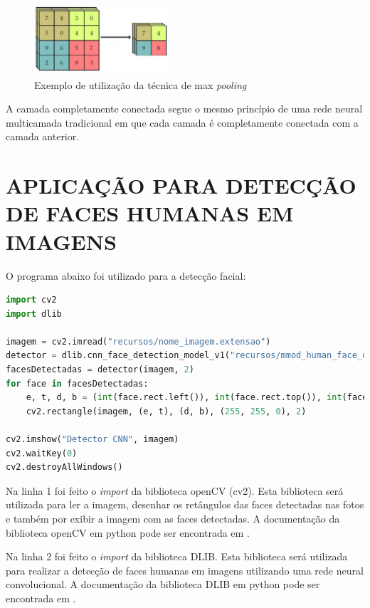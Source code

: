 \documentclass[conference]{IEEEtran}
\begin{document}
       \begin{figure}[h!b]
			\centering \includegraphics[width=5cm,height=2.7cm]{max-pooling.jpg}
			\caption{Exemplo de utilização da técnica de max \textit{pooling} \cite{b2}} 
		\end{figure}         
         
          A camada completamente conectada segue o mesmo princípio de uma rede neural multicamada tradicional em que cada camada é completamente conectada com a camada anterior.             
         
	 \section{APLICAÇÃO PARA DETECÇÃO DE FACES HUMANAS EM IMAGENS}
	 
          O programa abaixo foi utilizado para a detecção facial:	   
         
		  \begin{lstlisting}[breaklines=true, language=Python, caption=Programa utilizado para detecção facial]
import cv2
import dlib

imagem = cv2.imread("recursos/nome_imagem.extensao")
detector = dlib.cnn_face_detection_model_v1("recursos/mmod_human_face_detector.dat")
facesDetectadas = detector(imagem, 2)
for face in facesDetectadas:
    e, t, d, b = (int(face.rect.left()), int(face.rect.top()), int(face.rect.right()), int(face.rect.bottom()))
    cv2.rectangle(imagem, (e, t), (d, b), (255, 255, 0), 2)

cv2.imshow("Detector CNN", imagem)
cv2.waitKey(0)
cv2.destroyAllWindows()\end{lstlisting}


         Na linha 1 foi feito o \textit{import} da biblioteca openCV (cv2). Esta biblioteca será utilizada para ler a imagem, desenhar os retângulos das faces detectadas nas fotos e também por exibir a imagem com as faces detectadas. A documentação da biblioteca openCV em python pode ser encontrada em \cite{b3}.
         
         Na linha 2 foi feito o \textit{import} da biblioteca DLIB. Esta biblioteca será utilizada para realizar a detecção de faces humanas em imagens utilizando uma rede neural convolucional. A documentação da biblioteca DLIB em python pode ser encontrada em \cite{b4}.
         
\end{document}
